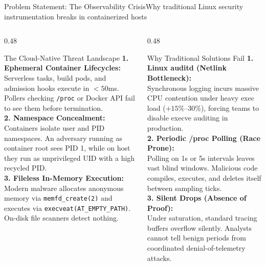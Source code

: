 \documentclass[aspectratio=169,10pt]{beamer}
\begin{document}
\begin{frame}{Problem Statement: The Observability Crisis}{Why traditional Linux security instrumentation breaks in containerized hosts}
  \begin{columns}[T]
    \begin{column}{0.48\textwidth}
      \begin{block}{The Cloud-Native Threat Landscape}
        \scriptsize
        \textbf{1. Ephemeral Container Lifecycles:}\\
        Serverless tasks, build pods, and admission hooks execute in $<50$ms. Pollers checking \texttt{/proc} or Docker API fail to see them before termination.\\[0.15cm]
        \textbf{2. Namespace Concealment:}\\
        Containers isolate user and PID namespaces. An adversary running as container root sees PID 1, while on host they run as unprivileged UID with a high recycled PID.\\[0.15cm]
        \textbf{3. Fileless In-Memory Execution:}\\
        Modern malware allocates anonymous memory via \texttt{memfd\_create(2)} and executes via \texttt{execveat(AT\_EMPTY\_PATH)}. On-disk file scanners detect nothing.
      \end{block}
    \end{column}

    \begin{column}{0.48\textwidth}
      \begin{alertblock}{Why Traditional Solutions Fail}
        \scriptsize
        \textbf{1. Linux auditd (Netlink Bottleneck):}\\
        Synchronous logging incurs massive CPU contention under heavy exec load ($+15\%\text{--}30\%$), forcing teams to disable execve auditing in production.\\[0.15cm]
        \textbf{2. Periodic /proc Polling (Race Prone):}\\
        Polling on 1s or 5s intervals leaves vast blind windows. Malicious code compiles, executes, and deletes itself between sampling ticks.\\[0.15cm]
        \textbf{3. Silent Drops (Absence of Proof):}\\
        Under saturation, standard tracing buffers overflow silently. Analysts cannot tell benign periods from coordinated denial-of-telemetry attacks.
      \end{alertblock}
    \end{column}
  \end{columns}
\end{frame}
\end{document}
